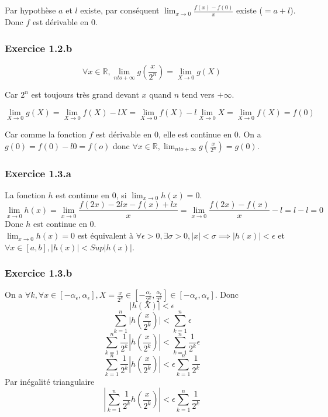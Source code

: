 \documentclass[]{book}
\theoremstyle{definition}
\newcommand{\bb}[1]{\mathbb{#1}}
\newcommand{\R}{\bb{R}}
\begin{document}
Par hypoth\`ese $a$ et $l$ existe, par cons\'equent $\lim_{x \to 0} \frac{f(x)- f(0)}{x}$ existe ($= a+l$). Donc $f$ est d\'erivable en 0.

\subsubsection*{Exercice 1.2.b}
$$\forall x \in \R, \lim_{n to +\infty}g\left(\frac{x}{2^n}\right) = \lim_{X \to 0}g(X)$$

Car $2^n$ est toujours tr\`es grand devant $x$ quand $n$ tend vers $+\infty$.
  
$$\lim_{X \to 0}g(X) = \lim_{X \to 0} f(X) - lX = \lim_{X \to 0} f(X) - l\lim_{X \to 0}X = \lim_{X \to 0} f(X) = f(0)$$

Car comme la fonction $f$ est d\'erivable en 0, elle est continue en 0.
On a $g(0) = f(0) - l0 = f(o)$ donc $\forall x \in \R, \lim_{n to +\infty}g\left(\frac{x}{2^n}\right) = g(0)$.

\subsubsection*{Exercice 1.3.a}
La fonction $h$ est continue en 0, si $\lim_{x \to 0} h(x) = 0$.
$$\lim_{x \to 0}h(x) = \lim_{x \to 0}\frac{f(2x)-2lx - f(x) + lx}{x} = \lim_{x \to 0}\frac{f(2x) - f(x)}{x} - l = l - l = 0$$
Donc $h$ est continue en 0.\\

$\lim_{x \to 0}h(x) = 0$ est \'equivalent \`a $\forall \epsilon > 0, \exists \sigma > 0, |x|<\sigma \implies |h(x)| < \epsilon$ et $\forall x \in [a,b], |h(x)| < Sup|h(x)|$. \\

\subsubsection*{Exercice 1.3.b}

On a $\forall k, \forall x \in [-\alpha_{\epsilon}, \alpha_{\epsilon}], X = 
\frac{x}{2^k} \in [-\frac{\alpha_{\epsilon}}{2^k}, \frac{\alpha_{\epsilon}}{2^k}] \in [-\alpha_{\epsilon}, \alpha_{\epsilon}]$. Donc
$$|h(X)| < \epsilon$$
$$\sum_{k=1}^{n}{|h(\frac{x}{2^k})}| < \sum_{k=1}^{n}{\epsilon}$$
$$\sum_{k=1}^{n}{\frac{1}{2^k}|h(\frac{x}{2^k})|} < \sum_{k=1}^{n}{\frac{1}{2^k} \epsilon}$$
$$\sum_{k=1}^{n}{\frac{1}{2^k}|h(\frac{x}{2^k})|} < \epsilon \sum_{k=1}^{n}{\frac{1}{2^k}}$$
Par in\'egalit\'e triangulaire
$$|\sum_{k=1}^{n}{\frac{1}{2^k}h(\frac{x}{2^k})}| < \epsilon \sum_{k=1}^{n}{\frac{1}{2^k}}$$
\end{document}

